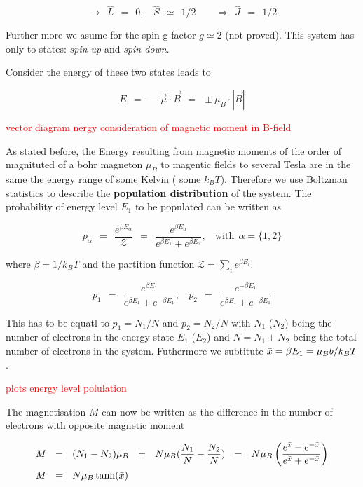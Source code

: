 \documentclass[10pt]{report}
\numberwithin{equation}{chapter}
\begin{document}
\begin{equation}
  \rightarrow ~~ \hat{L} ~~=~~0, ~~~~ \hat{S} ~~≃~~ 1/2 ~~~~~~~~~\Rightarrow ~~ \hat{J} ~~=~~ 1/2
\end{equation}

Further more we asume for the spin g-factor $g \simeq 2$ (not proved). This system has only to states: \textit{spin-up} and \textit{spin-down}.


Consider the energy of these two states leads to

\begin{equation}
  E ~~=~~ - \vec{\mu} \cdot \vec{B} ~~=~~ \pm \mu_B \cdot |\vec{B}|
\end{equation}

\textcolor{red}{ vector diagram nergy consideration of magnetic moment in B-field}

As stated before, the Energy resulting from magnetic moments of the order of magnituted of a bohr magneton $\mu_B$ to magentic fields to several Tesla are in the same the energy range of some Kelvin ( some $k_B T$). Therefore we use Boltzman statistics to describe the \textbf{population distribution} of the system. The probability of energy level $E_1$ to be populated can be written as

\begin{equation}
  p_\alpha ~~=~~ \frac{e^{\beta E_\alpha}}{\mathcal{Z}} ~~=~~ \frac{e^{\beta E_\alpha}}{e^{\beta E_1} + e^{\beta E_2}}, ~~~~ \text{with} ~~ \alpha = \{1,2\}
\end{equation}


where $\beta = 1/k_BT$ and the partition function $\mathcal{Z} = \sum_i e^{\beta E_i}$. 


\begin{equation}
  p_1 ~~=~~ \frac{e^{ \beta E_1}}{e^{\beta E_1} + e^{-\beta E_1}}, ~~~~ 
  p_2 ~~=~~ \frac{e^{-\beta E_1}}{e^{\beta E_1} + e^{-\beta E_1}}
\end{equation}

This has to be equatl to $p_1 = N_1/N$ and $p_2 = N_2/N$ with $N_1$ ($N_2$) being the number of electrons in the energy state $E_1$ ($E_2$) and $N = N_1 + N_2$ being the total number of electrons in the system. Futhermore we subtitute $\Bar{x} = \beta E_1 = \mu_B b/k_B T$.

\textcolor{red}{plots energy level polulation}


The magnetisation $M$ can now be written as the difference in the number of electrons with opposite magnetic moment

\begin{align}
  M ~~& =~~ (N_1 - N_2) \mu_B ~~=~~ N \mu_B (\frac{N_1}{N} - \frac{N_2}{N}) ~~=~~ 
  N \mu_B \left( \frac{e^{\Bar{x}} - e^{-\Bar{x}}}{e^{\Bar{x}} + e^{-\Bar{x}}} \right) \nonumber \\
  M ~~& =~~ N \mu_B \tanh(\Bar{x})
\end{align}
\end{document}
